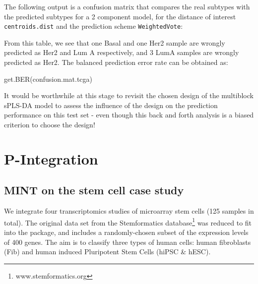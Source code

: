 \documentclass[
]{book}
\newenvironment{Shaded}{\begin{snugshade}}{\end{snugshade}}
\newcommand{\AttributeTok}[1]{\textcolor[rgb]{0.77,0.63,0.00}{#1}}
\newcommand{\DecValTok}[1]{\textcolor[rgb]{0.00,0.00,0.81}{#1}}
\newcommand{\FunctionTok}[1]{\textcolor[rgb]{0.00,0.00,0.00}{#1}}
\newcommand{\NormalTok}[1]{#1}
\newcommand{\OtherTok}[1]{\textcolor[rgb]{0.56,0.35,0.01}{#1}}
\newcommand{\SpecialCharTok}[1]{\textcolor[rgb]{0.00,0.00,0.00}{#1}}
\begin{document}
The following output is a confusion matrix that compares the real subtypes with the predicted subtypes for a 2 component model, for the distance of interest \texttt{centroids.dist} and the prediction scheme \texttt{WeightedVote}:

\begin{Shaded}
\end{Shaded}

From this table, we see that one Basal and one Her2 sample are wrongly predicted as Her2 and Lum A respectively, and 3 LumA samples are wrongly predicted as Her2. The balanced prediction error rate can be obtained as:

\begin{Shaded}
\begin{Highlighting}[]
\FunctionTok{get.BER}\NormalTok{(confusion.mat.tcga)}
\end{Highlighting}
\end{Shaded}

It would be worthwhile at this stage to revisit the chosen design of the multiblock sPLS-DA model to assess the influence of the design on the prediction performance on this test set - even though this back and forth analysis is a biased criterion to choose the design!

\hypertarget{pInte}{%
\chapter{P-Integration}\label{pInte}}

\hypertarget{pInte:mint-stemcell-case}{%
\section{MINT on the stem cell case study}\label{pInte:mint-stemcell-case}}

We integrate four transcriptomics studies of microarray stem cells (125 samples in total). The original data set from the Stemformatics database\footnote{www.stemformatics.org} \citep{Well13} was reduced to fit into the package, and includes a randomly-chosen subset of the expression levels of 400 genes. The aim is to classify three types of human cells: human fibroblasts (Fib) and human induced Pluripotent Stem Cells (hiPSC \& hESC).
\end{document}
